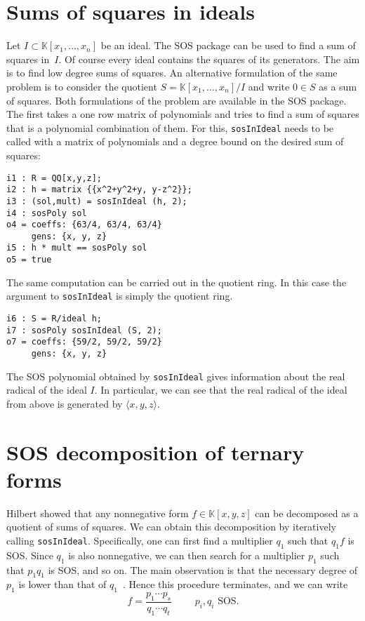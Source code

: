 \documentclass[11pt]{amsart}
\theoremstyle{plain}%
\theoremstyle{definition}
\theoremstyle{remark}
\newcommand{\SOS}{\textsc{SOS}\xspace}
\newcommand{\kk}{\mathbb{K}}
\begin{document}

\section{Sums of squares in ideals}
Let $I \subset \kk[x_{1},\dots,x_{n}]$ be an ideal.  The \SOS package can be used to find a sum of squares in~$I$.
Of course every ideal contains the squares of its generators.
The aim is to find low degree sums of squares.
An alternative formulation of the same problem is to consider the quotient $S = \kk[x_{1},\dots,x_{n}]/I$ and write $0\in S$ as a sum of squares.
Both formulations of the problem are available in the \SOS package.
The first takes a one row matrix of polynomials and tries to find a sum of squares that is a polynomial combination of them.
For this, \verb|sosInIdeal| needs to be called with a matrix of polynomials and a degree bound on the desired sum of squares:
{\small
\begin{verbatim}
i1 : R = QQ[x,y,z];
i2 : h = matrix {{x^2+y^2+y, y-z^2}};
i3 : (sol,mult) = sosInIdeal (h, 2);
i4 : sosPoly sol
o4 = coeffs: {63/4, 63/4, 63/4}
     gens: {x, y, z}
i5 : h * mult == sosPoly sol
o5 = true
\end{verbatim}
}
The same computation can be carried out in the quotient ring.
In this case the argument to \verb|sosInIdeal| is simply the quotient ring.
{\small
\begin{verbatim}
i6 : S = R/ideal h;
i7 : sosPoly sosInIdeal (S, 2);
o7 = coeffs: {59/2, 59/2, 59/2}
     gens: {x, y, z}
\end{verbatim}
}
The SOS polynomial obtained by \verb|sosInIdeal| gives information about the real radical of the ideal $I$.
In particular, we can see that the real radical of the ideal from above is generated by $\langle x,y,z\rangle$.

\section{SOS decomposition of ternary forms}

Hilbert showed that any nonnegative form $f\in \kk[x,y,z]$ can be decomposed as a quotient of sums of squares.
We can obtain this decomposition by iteratively calling \verb|sosInIdeal|.
Specifically, one can first find a multiplier $q_{1}$ such that $q_{1}f$ is SOS.
Since $q_1$ is also nonnegative, we can then search for a multiplier $p_{1}$ such that $p_{1}q_{1}$ is SOS, and so on.
The main observation is that the necessary degree of $p_{1}$ is lower than that of $q_{1}$~\cite{de2004products}.
Hence this procedure terminates, and we can write 
\[
  f = \frac{p_{1}\cdots p_{s}}{q_{1}\cdots q_{t}} \qquad \text {
    $p_{i},q_{i}$ SOS}.
\]
\end{document}
